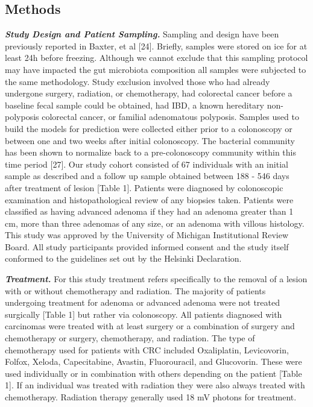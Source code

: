\documentclass[12pt,]{article}
\begin{document}
\newpage

\subsection{Methods}\label{methods}

\textbf{\emph{Study Design and Patient Sampling.}} Sampling and design
have been previously reported in Baxter, et al {[}24{]}. Briefly,
samples were stored on ice for at least 24h before freezing. Although we
cannot exclude that this sampling protocol may have impacted the gut
microbiota composition all samples were subjected to the same
methodology. Study exclusion involved those who had already undergone
surgery, radiation, or chemotherapy, had colorectal cancer before a
baseline fecal sample could be obtained, had IBD, a known hereditary
non-polyposis colorectal cancer, or familial adenomatous polyposis.
Samples used to build the models for prediction were collected either
prior to a colonoscopy or between one and two weeks after initial
colonoscopy. The bacterial community has been shown to normalize back to
a pre-colonoscopy community within this time period {[}27{]}. Our study
cohort consisted of 67 individuals with an initial sample as described
and a follow up sample obtained between 188 - 546 days after treatment
of lesion {[}Table 1{]}. Patients were diagnosed by colonoscopic
examination and histopathological review of any biopsies taken. Patients
were classified as having advanced adenoma if they had an adenoma
greater than 1 cm, more than three adenomas of any size, or an adenoma
with villous histology. This study was approved by the University of
Michigan Institutional Review Board. All study participants provided
informed consent and the study itself conformed to the guidelines set
out by the Helsinki Declaration.

\textbf{\emph{Treatment.}} For this study treatment refers specifically
to the removal of a lesion with or without chemotherapy and radiation.
The majority of patients undergoing treatment for adenoma or advanced
adenoma were not treated surgically {[}Table 1{]} but rather via
colonoscopy. All patients diagnosed with carcinomas were treated with at
least surgery or a combination of surgery and chemotherapy or surgery,
chemotherapy, and radiation. The type of chemotherapy used for patients
with CRC included Oxaliplatin, Levicovorin, Folfox, Xeloda,
Capecitabine, Avastin, Fluorouracil, and Glucovorin. These were used
individually or in combination with others depending on the patient
{[}Table 1{]}. If an individual was treated with radiation they were
also always treated with chemotherapy. Radiation therapy generally used
18 mV photons for treatment.
\end{document}
